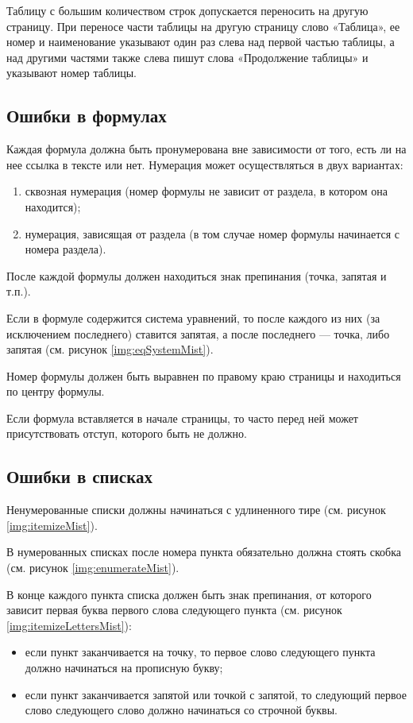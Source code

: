 Таблицу с большим количеством строк допускается переносить на другую страницу. При переносе части таблицы на другую страницу слово «Таблица», ее номер и наименование указывают один раз слева над первой частью таблицы, а над другими частями также слева пишут слова «Продолжение таблицы» и указывают номер таблицы\cite{GOST732}.

\subsection{Ошибки в формулах}
Каждая формула должна быть пронумерована вне зависимости от того, есть ли на нее ссылка в тексте или нет. Нумерация может осуществляться в двух вариантах:
\begin{enumerate}
	\item сквозная нумерация (номер формулы не зависит от раздела, в котором она находится);
	\item нумерация, зависящая от раздела (в том случае номер формулы начинается с номера раздела).
\end{enumerate}

После каждой формулы должен находиться знак препинания (точка, запятая и т.п.).

Если в формуле содержится система уравнений, то после каждого из них (за исключением последнего) ставится запятая, а после последнего --- точка, либо запятая (см. рисунок \ref{img:eqSystemMist}).

Номер формулы должен быть выравнен по правому краю страницы и находиться по центру формулы.

Если формула вставляется в начале страницы, то часто перед ней может присутствовать отступ, которого быть не должно.

\subsection{Ошибки в списках}
Ненумерованные списки должны начинаться с удлиненного тире (см. рисунок \ref{img:itemizeMist}).

В нумерованных списках после номера пункта обязательно должна стоять скобка (см. рисунок \ref{img:enumerateMist}).

В конце каждого пункта списка должен быть знак препинания, от которого зависит первая буква первого слова следующего пункта (см. рисунок \ref{img:itemizeLettersMist}):
\begin{itemize}
	\item если пункт заканчивается на точку, то первое слово следующего пункта должно начинаться на прописную букву;
	\item если пункт заканчивается запятой или точкой с запятой, то следующий первое слово следующего слово должно начинаться со строчной буквы.
\end{itemize}

